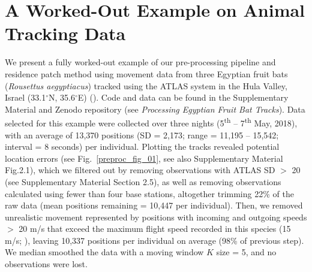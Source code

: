 \section*{A Worked-Out Example on Animal Tracking Data}

We present a fully worked-out example of our pre-processing pipeline and residence patch method using movement data from three Egyptian fruit bats (\textit{Rousettus aegyptiacus}) tracked using the ATLAS system in the Hula Valley, Israel (33.1$^{\circ}$N, 35.6$^{\circ}$E) (\citealt{toledo2020, lourie2021}).
Code and data can be found in the Supplementary Material and Zenodo repository (see \textit{Processing Egyptian Fruit Bat Tracks}). 
Data selected for this example were collected over three nights (5\textsuperscript{th} -- 7\textsuperscript{th} May, 2018), with an average of 13,370 positions (SD = 2,173; range = 11,195 -- 15,542; interval = 8 seconds) per individual.
Plotting the tracks revealed potential location errors (see Fig.~\ref{preproc_fig_01}, see also Supplementary Material Fig.2.1), which we filtered out by removing observations with ATLAS SD $>$ 20 (see Supplementary Material Section 2.5), as well as removing observations calculated using fewer than four base stations, altogether trimming 22\% of the raw data (mean positions remaining = 10,447 per individual).
Then, we removed unrealistic movement represented by positions with incoming and outgoing speeds $>$ 20 m/s that exceed the maximum flight speed recorded in this species (15 m/s; \citealt{tsoar2011}), leaving 10,337 positions per individual on average (98\% of previous step).
We median smoothed the data with a moving window $K$ size = 5, and no observations were lost.

